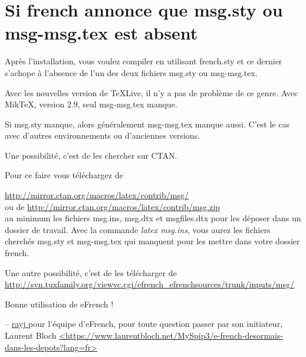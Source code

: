 \documentclass[11pt, a4paper]{article}
\author{Raymond Juillerat}
\begin{document}
\section*{Si french annonce que msg.sty ou msg-msg.tex est absent }

Après l’installation, 
vous voulez compiler en utilisant french.sty et ce dernier s'achope à
l'absence de l'un des deux fichiers msg.sty ou msg-msg.tex. 

Avec les nouvelles version de TeXLive, il n'y a pas de problème de ce genre.
Avec MikTeX, version 2.9, seul msg-msg.tex manque.

Si msg.sty manque, alors généralement msg-msg.tex manque aussi.
C'est le cas avec d'autres environnements ou d'anciennes versions.

Une possibilité, c'est de les chercher sur CTAN.

Pour ce faire vous téléchargez de

\href{http://mirror.ctan.org/macros/latex/contrib/msg}
{http://mirror.ctan.org/macros/latex/contrib/msg/}\\
ou de \href{http://mirror.ctan.org/macros/latex/contrib/msg.zip}
{http://mirror.ctan.org/macros/latex/contrib/msg.zip}\\
au minimum les fichiers msg.ins, msg.dtx et msgfiles.dtx pour les
déposer dans un dossier de travail. Avec la commande 
\textit{latex msg.ins}, vous aurez les fichiers cherchés
 msg.sty et msg-msg.tex qui manquent  pour les mettre 
dans votre dossier french.

Une autre possibilité, c'est de les télécharger de\\
\href{http://svn.tuxfamily.org/viewvc.cgi/efrench\_efrenchsources/trunk/inputs/msg/}
{http://svn.tuxfamily.org/viewvc.cgi/efrench\_efrenchsources/trunk/inputs/msg/}\\


\begin{center}{Bonne utilisation de eFrench !}
\end{center}

  -- \href{mailto:raymond@juil.ch}{rayj }
pour l'équipe d'eFrench, pour toute question passer par son initiateur,
{Laurent Bloch}
\href{https://www.laurentbloch.net/MySpip3/e-french-desormais-dans-les-depots?lang=fr}{<https://www.laurentbloch.net/MySpip3/e-french-desormais-dans-les-depots?lang=fr>}
\end{document}
